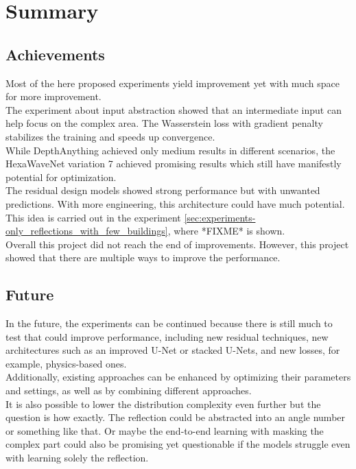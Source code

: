 \chapter{Summary}
\label{cha:summary}

	
	
	\section{Achievements}
	\label{sec:sum-reached}
	Most of the here proposed experiments yield improvement yet with much space for more improvement.\\
	The experiment about input abstraction showed that an intermediate input can help focus on the complex area. The Wasserstein loss with gradient penalty stabilizes the training and speeds up convergence.\\
	While DepthAnything achieved only medium results in different scenarios, the HexaWaveNet variation 7 achieved promising results which still have manifestly potential for optimization.\\
	The residual design models showed strong performance but with unwanted predictions. With more engineering, this architecture could have much potential.\\
	This idea is carried out in the experiment \ref{sec:experiments-only_reflections_with_few_buildings}, where *FIXME* is shown.\\
	Overall this project did not reach the end of improvements. However, this project showed that there are multiple ways to improve the performance.
	
	\section{Future}
	\label{sec:sum-future}
	In the future, the experiments can be continued because there is still much to test that could improve performance, including new residual techniques, new architectures such as an improved U-Net or stacked U-Nets, and new losses, for example, physics-based ones.\\
	Additionally, existing approaches can be enhanced by optimizing their parameters and settings, as well as by combining different approaches. \\
	It is also possible to lower the distribution complexity even further but the question is how exactly. The reflection could be abstracted into an angle number or something like that. Or maybe the end-to-end learning with masking the complex part could also be promising yet questionable if the models struggle even with learning solely the reflection.
	
	
	
